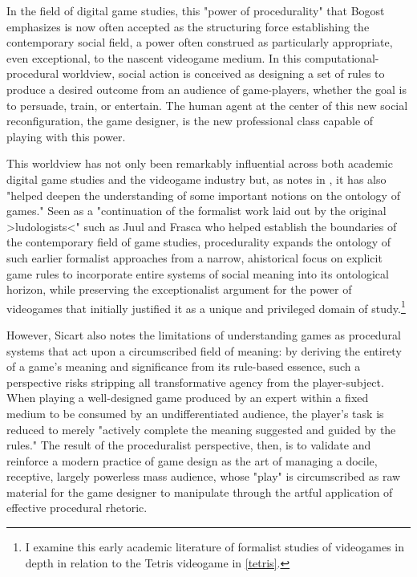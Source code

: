 In the field of digital game studies, this "power of procedurality" that Bogost emphasizes is now often accepted as the structuring force establishing the contemporary social field, a power often construed as particularly appropriate, even exceptional, to the nascent videogame medium. In this computational-procedural worldview, social action is conceived as designing a set of rules to produce a desired outcome from an audience of game-players, whether the goal is to persuade, train, or entertain. The human agent at the center of this new social reconfiguration, the game designer, is the new professional class capable of playing with this power.

This worldview has not only been remarkably influential across both academic digital game studies and the videogame industry but, as \citeauthor{Sicart2011-dd} notes in , it has also "helped deepen the understanding of some important notions on the ontology of games." Seen as a "continuation of the formalist work laid out by the original >ludologists<" such as Juul and Frasca who helped establish the boundaries of the contemporary field of game studies, procedurality expands the ontology of such earlier formalist approaches from a narrow, ahistorical focus on explicit game rules to incorporate entire systems of social meaning into its ontological horizon, while preserving the exceptionalist argument for the power of videogames that initially justified it as a unique and privileged domain of study.\footnote{ I examine this early academic literature of formalist studies of videogames in depth in relation to the Tetris videogame in \cref{tetris}.}

However, Sicart also notes the limitations of understanding games as procedural systems that act upon a circumscribed field of meaning: by deriving the entirety of a game's meaning and significance from its rule-based essence, such a perspective risks stripping all transformative agency from the player-subject. When playing a well-designed game produced by an expert within a fixed medium to be consumed by an undifferentiated audience, the player's task is reduced to merely "actively complete the meaning suggested and guided by the rules." The result of the proceduralist perspective, then, is to validate and reinforce a modern practice of game design as the art of managing a docile, receptive, largely powerless mass audience, whose "play" is circumscribed as raw material for the game designer to manipulate through the artful application of effective procedural rhetoric.

